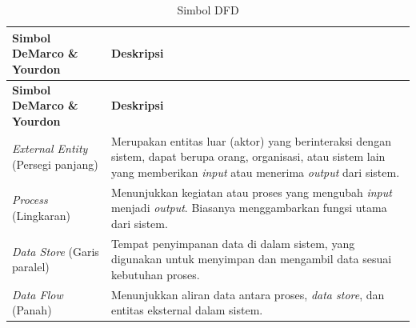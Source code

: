 \begin{longtable}{|p{}|p{}|}
	\caption{Simbol DFD}
	\label{table:2.simbolDFD}\\
	\hline
	\textbf{Simbol DeMarco \& Yourdon} & \textbf{Deskripsi} \\
	\hline
	\endfirsthead
	\hline
	\textbf{Simbol DeMarco \& Yourdon} & \textbf{Deskripsi} \\
	\hline
	\endhead
	\textit{External Entity} (Persegi panjang) & Merupakan entitas luar (aktor) yang berinteraksi dengan sistem, dapat berupa orang, organisasi, atau sistem lain yang memberikan \textit{input} atau menerima \textit{output} dari sistem. \\
	\hline
	\textit{Process} (Lingkaran) & Menunjukkan kegiatan atau proses yang mengubah \textit{input} menjadi \textit{output}. Biasanya menggambarkan fungsi utama dari sistem. \\
	\hline
	\textit{Data Store} (Garis paralel) & Tempat penyimpanan data di dalam sistem, yang digunakan untuk menyimpan dan mengambil data sesuai kebutuhan proses. \\
	\hline
	\textit{Data Flow} (Panah) & Menunjukkan aliran data antara proses, \textit{data store}, dan entitas eksternal dalam sistem. \\
	\hline
\end{longtable}
